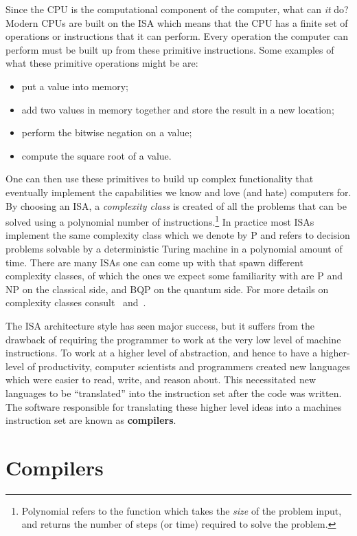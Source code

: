 Since the \ac{CPU} is the computational component of the computer, what can \emph{it} do?
Modern \acp{CPU} are built on the \ac{ISA} which means that the \ac{CPU} has a finite set of operations or instructions that it can perform.
Every operation the computer can perform must be built up from these primitive instructions.
Some examples of what these primitive operations might be are:
\begin{itemize}
    \item put a value into memory;
    \item add two values in memory together and store the result in a new location;
    \item perform the bitwise negation on a value;
    \item compute the square root of a value.
\end{itemize}
One can then use these primitives to build up complex functionality that eventually implement the capabilities we know and love (and hate) computers for.
By choosing an \ac{ISA}, a \emph{complexity class} is created of all the problems that can be solved using a polynomial number of instructions.\footnote{Polynomial refers to the function which takes the \emph{size} of the problem input, and returns the number of steps (or time) required to solve the problem.}
In practice most \acp{ISA} implement the same complexity class which we denote by P and refers to decision problems solvable by a deterministic Turing machine in a polynomial amount of time. %
There are many \acp{ISA} one can come up with that spawn different complexity classes, of which the ones we expect some familiarity with are P and NP on the classical side, and BQP on the quantum side.
For more details on complexity classes consult~\cite{complexity} and~\cite[Chapter 3]{nielsenchuang}.

The \ac{ISA} architecture style has seen major success, but it suffers from the drawback of requiring the programmer to work at the very low level of machine instructions.
To work at a higher level of abstraction, and hence to have a higher-level of productivity, computer scientists and programmers created new languages which were easier to read, write, and reason about.
This necessitated new languages to be ``translated'' into the instruction set after the code was written.
The software responsible for translating these higher level ideas into a machines instruction set are known as \textbf{compilers}.

\section{Compilers}


